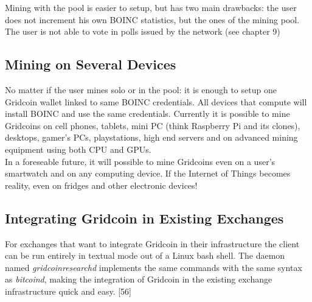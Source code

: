 Mining with the pool is easier to setup, but has two main drawbacks: the user does not increment his own BOINC statistics, but the ones of the  mining pool. The user is not able to vote in polls issued by the network (see chapter 9)

\subsection{Mining on Several Devices}

No matter if the user mines solo or in the pool: it is enough to setup one Gridcoin wallet linked to same BOINC credentials. All devices that compute will install BOINC and use the same credentials. Currently it is possible to mine Gridcoins on cell phones, tablets, mini PC (think Raspberry Pi and its clones), desktops, gamer's PCs, playstations, high end servers and on advanced mining equipment using both CPU and GPUs.\\

In a foreseable future, it will possible to mine Gridcoins even on a user's smartwatch and on any computing device. If the Internet of Things becomes reality, even on fridges and other electronic devices!

\subsection{Integrating Gridcoin in Existing Exchanges}

For exchanges that want to integrate Gridcoin in their infrastructure the client can be run entirely in textual mode out of a Linux bash shell. The daemon named \textit{gridcoinresearchd} implements the same commands with the same syntax as \textit{bitcoind}, making the integration of Gridcoin in the existing exchange infrastructure quick and easy. [56]\\
